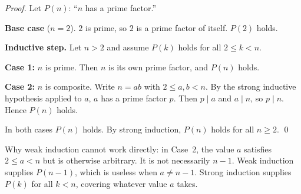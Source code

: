 \begin{example}
\textit{Proof.}
Let $P(n)$: ``$n$ has a prime factor.''

\medskip
\noindent\textbf{Base case} ($n = 2$).
$2$ is prime, so $2$ is a prime factor of itself. $P(2)$ holds.

\medskip
\noindent\textbf{Inductive step.}
Let $n > 2$ and assume $P(k)$ holds for all $2 \leq k < n$.

\textbf{Case 1:} $n$ is prime. Then $n$ is its own prime factor,
and $P(n)$ holds.

\textbf{Case 2:} $n$ is composite. Write $n = ab$ with $2 \leq a, b < n$.
By the strong inductive hypothesis applied to $a$, $a$ has a prime
factor $p$. Then $p \mid a$ and $a \mid n$, so $p \mid n$.
Hence $P(n)$ holds.

In both cases $P(n)$ holds. By strong induction, $P(n)$ holds for
all $n \geq 2$. \qed

\medskip
\noindent
Why weak induction cannot work directly: in Case~2, the value $a$
satisfies $2 \leq a < n$ but is otherwise arbitrary. It is not
necessarily $n-1$. Weak induction supplies $P(n-1)$, which is useless
when $a \neq n-1$. Strong induction supplies $P(k)$ for all $k < n$,
covering whatever value $a$ takes.
\end{example}
